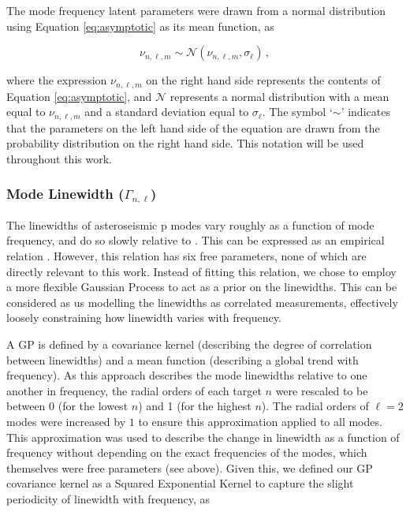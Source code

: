 The mode frequency latent parameters were drawn from a normal distribution using Equation \ref{eq:asymptotic} as its mean function, as

\begin{equation}
	\nu_{n, \ell, m} \sim \mathcal{N}(\nu_{n, \ell, m}, \sigma_{\ell})\, ,
\end{equation}

\noindent where the expression $\nu_{n, \ell, m}$ on the right hand side represents the contents of Equation \ref{eq:asymptotic}, and $\mathcal{N}$ represents a normal distribution with a mean equal to $\nu_{n, \ell, m}$ and a standard deviation equal to $\sigma_{\ell}$. The symbol `$\sim$' indicates that the parameters on the left hand side of the equation are drawn from the probability distribution on the right hand side. This notation will be used throughout this work.

\subsubsection{Mode Linewidth ($\Gamma_{n,\ell}$)}
The linewidths of asteroseismic p modes vary roughly as a function of mode frequency, and do so slowly relative to \dnu. This can be expressed as an empirical relation \cite{lund+2017, davies+2014, appourchaux+2016}. However, this relation has six free parameters, none of which are directly relevant to this work. Instead of fitting this relation, we chose to employ a more flexible Gaussian Process \cite[GP]{rasmussen+williams2006} to act as a prior on the linewidths. This can be considered as us modelling the linewidths as correlated measurements, effectively loosely constraining how linewidth varies with frequency.

A GP is defined by a covariance kernel (describing the degree of correlation between linewidths) and a mean function (describing a global trend with frequency). As this approach describes the mode linewidths relative to one another in frequency, the radial orders of each target $n$ were rescaled to be between 0 (for the lowest $n$) and 1 (for the highest $n$). The radial orders of $\ell = 2$ modes were increased by $1$ to ensure this approximation applied to all modes. This approximation was used to describe the change in linewidth as a function of frequency without depending on the exact frequencies of the modes, which themselves were free parameters (see above). Given this, we defined our GP covariance kernel as a Squared Exponential Kernel to capture the slight periodicity of linewidth with frequency, as


